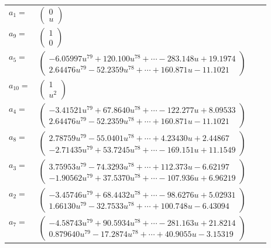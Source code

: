 \documentclass[1p]{elsarticle_modified}
\theoremstyle{definition}
\begin{document}
\begin{tabular}{m{7pt} m{180pt} m{7pt} m{180pt} }
\flushright $a_{1}=$&$\begin{pmatrix}0\\u\end{pmatrix}$ \\
\flushright $a_{9}=$&$\begin{pmatrix}1\\0\end{pmatrix}$ \\
\flushright $a_{5}=$&$\begin{pmatrix}-6.05997 u^{79}+120.100 u^{78}+\cdots-283.148 u+19.1974\\2.64476 u^{79}-52.2359 u^{78}+\cdots+160.871 u-11.1021\end{pmatrix}$ \\
\flushright $a_{10}=$&$\begin{pmatrix}1\\u^2\end{pmatrix}$ \\
\flushright $a_{4}=$&$\begin{pmatrix}-3.41521 u^{79}+67.8640 u^{78}+\cdots-122.277 u+8.09533\\2.64476 u^{79}-52.2359 u^{78}+\cdots+160.871 u-11.1021\end{pmatrix}$ \\
\flushright $a_{8}=$&$\begin{pmatrix}2.78759 u^{79}-55.0401 u^{78}+\cdots+4.23430 u+2.44867\\-2.71435 u^{79}+53.7245 u^{78}+\cdots-169.151 u+11.1549\end{pmatrix}$ \\
\flushright $a_{3}=$&$\begin{pmatrix}3.75953 u^{79}-74.3293 u^{78}+\cdots+112.373 u-6.62197\\-1.90562 u^{79}+37.5370 u^{78}+\cdots-107.936 u+6.96219\end{pmatrix}$ \\
\flushright $a_{2}=$&$\begin{pmatrix}-3.45746 u^{79}+68.4432 u^{78}+\cdots-98.6276 u+5.02931\\1.66130 u^{79}-32.7533 u^{78}+\cdots+100.748 u-6.43094\end{pmatrix}$ \\
\flushright $a_{7}=$&$\begin{pmatrix}-4.58743 u^{79}+90.5934 u^{78}+\cdots-281.163 u+21.8214\\0.879640 u^{79}-17.2874 u^{78}+\cdots+40.9055 u-3.15319\end{pmatrix}$ \\

\end{tabular}
\end{document}
